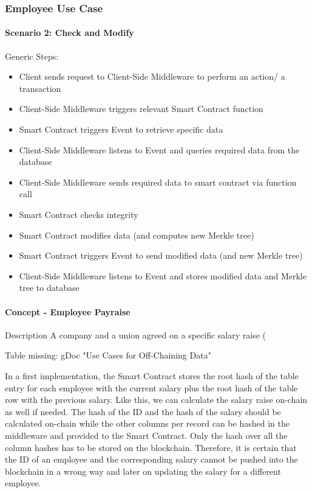 \subsubsection{Employee Use Case}
\paragraph{Scenario 2: Check and Modify}
Generic Steps:
\begin{itemize}
\item Client sends request to Client-Side Middleware to perform an action/ a transaction
\item Client-Side Middleware triggers relevant Smart Contract function
\item Smart Contract triggers Event to retrieve specific data
\item Client-Side Middleware listens to Event and queries required data from the database
\item Client-Side Middleware sends required data to smart contract via function call
\item Smart Contract checks integrity
\item Smart Contract modifies data (and computes new Merkle tree)
\item Smart Contract triggers Event to send modified data (and new Merkle tree)
\item Client-Side Middleware listens to Event and stores modified data and Merkle tree to database
\end{itemize}

\paragraph{Concept - Employee Payraise}
Description
A company and a union agreed on a specific salary raise (%

Table missing: gDoc "Use Cases for Off-Chaining Data"

In a first implementation, the Smart Contract stores the root hash of the table entry for each employee with the current salary plus the root hash of the table row with the previous salary. Like this, we can calculate the salary raise on-chain as well if needed.
The hash of the ID and the hash of the salary should be calculated on-chain while the other columns per record can be hashed in the middleware and provided to the Smart Contract. Only the hash over all the column hashes has to be stored on the blockchain. Therefore, it is certain that the ID of an employee and the corresponding salary cannot be pushed into the blockchain in a wrong way and later on updating the salary for a different employee.

